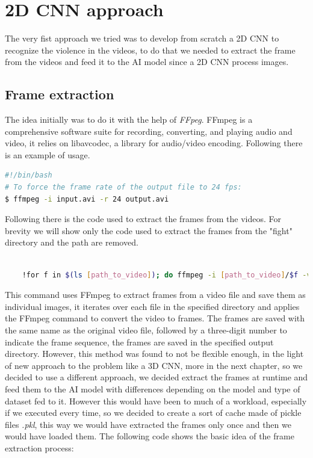 \chapter{2D CNN approach}
The very fist approach we tried was to develop from scratch a 2D CNN to recognize the violence in the videos, to do that we needed to extract the frame from the videos and feed it to the AI model since a 2D CNN process images.
\section{Frame extraction}
The idea initially was to do it with the help of \textit{FFpeg}. FFmpeg is a comprehensive software suite for recording, converting, and playing audio and video, it relies on libavcodec, a library for audio/video encoding. Following there is an example of usage.
\begin{lstlisting}[language=bash, caption={FFpeg example}, label={lst:FFpegExample}]
#!/bin/bash
# To force the frame rate of the output file to 24 fps:
$ ffmpeg -i input.avi -r 24 output.avi

\end{lstlisting}

Following there is the code used to extract the frames from the videos. For brevity we will show only the code used to extract the frames from the "fight" directory and the path are removed.
\begin{lstlisting}[language=bash, caption={Frame extraction}, label={lst:FrameExtraction}]

    !for f in $(ls [path_to_video]); do ffmpeg -i [path_to_video]/$f -vf fps=5 [path_to_frame]/${f%.*}-%03d.png; done;
\end{lstlisting}

This command uses FFmpeg to extract frames from a video file and save them as individual images, it iterates over each file in the specified directory and applies the FFmpeg command to convert the video to frames. The frames are saved with the same name as the original video file, followed by a three-digit number to indicate the frame sequence, the frames are saved in the specified output directory.
However, this method was found to not be flexible enough, in the light of new approach to the problem like a 3D CNN, more in the next chapter, so we decided to use a different approach, we decided extract the frames at runtime and feed them to the AI model with differences depending on the model and type of dataset fed to it. However this would have been to much of a workload, especially if we executed every time, so we decided to create a sort of cache made of pickle files \textit{.pkl}, this way we would have extracted the frames only once and then we would have loaded them. The following code shows the basic idea of the frame extraction process:

